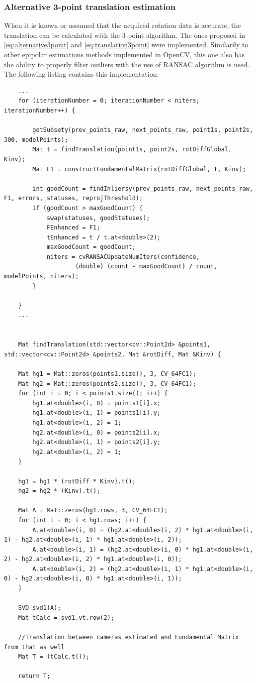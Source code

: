 \subsubsection{Alternative 3-point translation estimation}
When it is known or assumed that the acquired rotation data is accurate, the translation can be calculated with the 3-point algorithm. The ones proposed in \ref{eq:alternative3point} and \ref{eq:translation3point} were implemented. Similarily to other epipolar estimations methods implemented in OpenCV, this one also has the ability to properly filter outliers with the use of RANSAC algorithm is used. The following listing contains this implementation:
\begin{lstlisting}
    ...
    for (iterationNumber = 0; iterationNumber < niters; iterationNumber++) {

        getSubsety(prev_points_raw, next_points_raw, point1s, point2s, 300, modelPoints);
        Mat t = findTranslation(point1s, point2s, rotDiffGlobal, Kinv);
        Mat F1 = constructFundamentalMatrix(rotDiffGlobal, t, Kinv);

        int goodCount = findInliersy(prev_points_raw, next_points_raw, F1, errors, statuses, reprojThreshold);
        if (goodCount > maxGoodCount) {
            swap(statuses, goodStatuses);
            FEnhanced = F1;
            tEnhanced = t / t.at<double>(2);
            maxGoodCount = goodCount;
            niters = cvRANSACUpdateNumIters(confidence,
                    (double) (count - maxGoodCount) / count, modelPoints, niters);
        }

    }
    ...
    
    
    Mat findTranslation(std::vector<cv::Point2d> &points1, std::vector<cv::Point2d> &points2, Mat &rotDiff, Mat &Kinv) {

    Mat hg1 = Mat::zeros(points1.size(), 3, CV_64FC1);
    Mat hg2 = Mat::zeros(points2.size(), 3, CV_64FC1);
    for (int i = 0; i < points1.size(); i++) {
        hg1.at<double>(i, 0) = points1[i].x;
        hg1.at<double>(i, 1) = points1[i].y;
        hg1.at<double>(i, 2) = 1;
        hg2.at<double>(i, 0) = points2[i].x;
        hg2.at<double>(i, 1) = points2[i].y;
        hg2.at<double>(i, 2) = 1;
    }

    hg1 = hg1 * (rotDiff * Kinv).t();
    hg2 = hg2 * (Kinv).t();

    Mat A = Mat::zeros(hg1.rows, 3, CV_64FC1);
    for (int i = 0; i < hg1.rows; i++) {
        A.at<double>(i, 0) = (hg2.at<double>(i, 2) * hg1.at<double>(i, 1) - hg2.at<double>(i, 1) * hg1.at<double>(i, 2));
        A.at<double>(i, 1) = (hg2.at<double>(i, 0) * hg1.at<double>(i, 2) - hg2.at<double>(i, 2) * hg1.at<double>(i, 0));
        A.at<double>(i, 2) = (hg2.at<double>(i, 1) * hg1.at<double>(i, 0) - hg2.at<double>(i, 0) * hg1.at<double>(i, 1));
    }

    SVD svd1(A);
    Mat tCalc = svd1.vt.row(2);

    //Translation between cameras estimated and Fundamental Matrix from that as well
    Mat T = (tCalc.t());

    return T;

\end{lstlisting}
